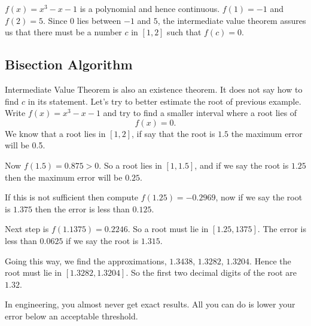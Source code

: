 \documentclass[../main.tex]{subfiles}
\begin{document}
\begin{solution}
    $f(x) = x^3 - x - 1$ is a polynomial and hence continuous. $f(1) = -1$ and $f(2) = 5$. Since $0$ lies between $-1$ and $5$, the intermediate value theorem assures us that there must be a number $c$ in $[1, 2]$ such that $f(c) = 0$.
\end{solution}

\subsection*{Bisection Algorithm}
Intermediate Value Theorem is also an existence theorem. It does not say how to find $c$ in its statement. Let's try to better estimate the root of previous example. Write $f(x) = x^3 - x - 1$ and try to find a smaller interval where a root lies of
\[
    f(x) = 0.
\]
We know that a root lies in $[1, 2]$, if say that the root is $1.5$ the maximum error will be 0.5.

Now $f(1.5)=0.875 > 0$. So a root lies in $[1, 1.5]$, and if we say the root is $1.25$ then the maximum error will be $0.25$.

If this is not sufficient then compute $f(1.25)=-0.2969$, now if we say the root is $1.375$ then the error is less than $0.125$.

Next step is $f(1.1375) = 0.2246$. So a root must lie in $[1.25, 1375]$. The error is less than $0.0625$ if we say the root is $1.315$.

Going this way, we find the approximations, $1.3438$, $1.3282$, $1.3204$. Hence the root must lie in $[1.3282, 1.3204]$. So the first two decimal digits of the root are $1.32$.

In engineering, you almost never get exact results. All you can do is lower your error below an acceptable threshold.
\end{document}
